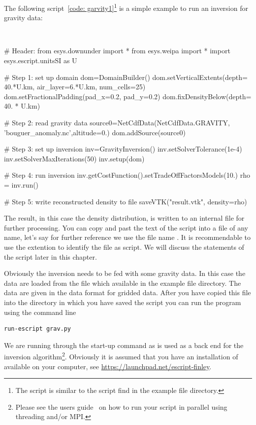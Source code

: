 The following script~\ref{code: garvity1}\footnote{The script is similar to the  script
find in the \escript example file directory.} is a simple example to run an inversion for gravity data: 
\begin{pyc}
\
\begin{verbatim*}
# Header:
from esys.downunder import *
from esys.weipa import *
import esys.escript.unitsSI as U

# Step 1: set up domain
dom=DomainBuilder()
dom.setVerticalExtents(depth= 40.*U.km, air_layer=6.*U.km, num_cells=25)
dom.setFractionalPadding(pad_x=0.2, pad_y=0.2)
dom.fixDensityBelow(depth= 40. * U.km)

# Step 2: read gravity data
source0=NetCdfData(NetCdfData.GRAVITY, 'bouguer_anomaly.nc',altitude=0.)
dom.addSource(source0)

# Step 3: set up inversion
inv=GravityInversion()
inv.setSolverTolerance(1e-4)
inv.setSolverMaxIterations(50)
inv.setup(dom)

# Step 4: run inversion 
inv.getCostFunction().setTradeOffFactorsModels(10.) 
rho = inv.run()

# Step 5: write reconstructed density to file
saveVTK("result.vtk", density=rho)
\end{verbatim*}\label{code: garvity1}
\end{pyc}
The result, in this
case the density distribution, is written to an internal file for further processing. You can copy and past the text of the 
script into a file of any name, let's say for further reference we use the file name \file{grav.py}. It is recommendable
to use the extention \file{py} to identify the file as \python script. We will discuss the statements
of the script later in this chapter. 

Obviously the inversion needs to be fed with some gravity data. In this case 
the data are loaded from the file \file{bouguer_anomaly.nc} which available in the \escript example file directory. The data are given 
in the \netcdf data format for gridded data. After you have copied this file into the directory in which you have
saved the script \file{grav.py} you can run the program using the command line 
\begin{verbatim}
run-escript grav.py
\end{verbatim}
We are running  through the \escript start-up command as \escript is used as a back end for the inversion 
algorithm\footnote{Please see the \escript users guide~\cite{ESCRIPT} on how to run 
your script in parallel using threading and/or MPI.}. Obviously it is  assumed that you have an
installation of \escript available on your computer, see \url{https://launchpad.net/escript-finley}.

